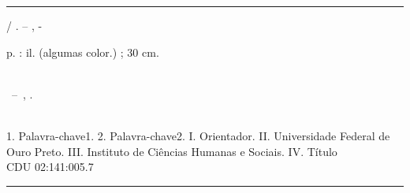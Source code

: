 \documentclass[
	12pt,				%
	openright,			%
	twoside,			%
	a4paper,			%
	english,			%
	brazil				%
	]{abntex2}
\begin{document}

%
%     
%
%
\begin{fichacatalografica}
	\vspace*{\fill}					%
	\hrule							%
	\begin{center}					%
	\begin{minipage}[c]{12.5cm}		%

	\imprimirautor

	\hspace{0.5cm} \imprimirtitulo  / \imprimirautor. --
	\imprimirlocal, \the\year-

	\hspace{0.5cm}  p. : il. (algumas color.) ; 30 cm.\\
	\hspace{0.5cm} \imprimirorientadorRotulo~\imprimirorientador\\

	\hspace{0.5cm}
	\parbox[t]{\textwidth}{\imprimirtipotrabalho~--~\imprimirinstituicao,
	\imprimirdata.}\\

	\hspace{0.5cm}
		1. Palavra-chave1.
		2. Palavra-chave2.
		I. Orientador.
		II. Universidade Federal de Ouro Preto.
		III. Instituto de Ciências Humanas e Sociais.
		IV. Título\\

	\hspace{8.75cm} CDU 02:141:005.7\\

	\end{minipage}
	\end{center}
	\hrule
\end{fichacatalografica}
\end{document}
